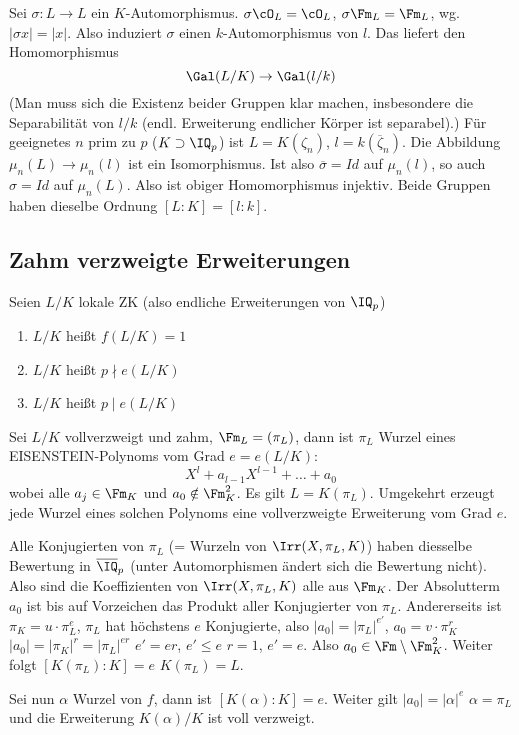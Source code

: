 \begin{Beweis}
 Sei $\sigma:L\rightarrow L$ ein $K$-Automorphismus. $\sigma\cO_L=\cO_L$, $\sigma\Fm_L=\Fm_L$, wg. $|\sigma x|=|x|$. Also induziert $\sigma$ einen $k$-Automorphismus von $l$. Das liefert den Homomorphismus
 \[ \Gal(L/K) \rightarrow \Gal(l/k)\]
 (Man muss sich die Existenz beider Gruppen klar machen, insbesondere die Separabilität von $l/k$ (endl. Erweiterung endlicher Körper ist separabel).)
 Für geeignetes $n$ prim zu $p$ ($K\supset \IQ_p$) ist $L=K(\zeta_n)$, $l=k(\overline\zeta_n)$. Die Abbildung $\mu_n(L)\rightarrow\mu_n(l)$ ist ein Isomorphismus. Ist also $\overline \sigma=Id$ auf $\mu_n(l)$, so auch $\sigma=Id$ auf $\mu_n(L)$. Also ist obiger Homomorphismus injektiv. Beide Gruppen haben dieselbe Ordnung $[L:K]=[l:k]$.
\end{Beweis}

\subsection{Zahm verzweigte Erweiterungen} %
\begin{Definition}
 Seien $L/K$ lokale ZK (also endliche Erweiterungen von $\IQ_p$)
 \begin{enumerate}
  \item $L/K$ heißt  \gdw $f(L/K)=1$
  \item $L/K$ heißt  \gdw $p\nmid e(L/K)$
  \item $L/K$ heißt  \gdw $p\mid e(L/K)$
 \end{enumerate}
\end{Definition}

\begin{Fakt}
 Sei $L/K$ vollverzweigt und zahm, $\Fm_L=(\pi_L)$, dann ist $\pi_L$ Wurzel eines EISENSTEIN-Polynoms vom Grad $e=e(L/K)$: \[ X^l+a_{l-1}X^{l-1}+\ldots+a_0\]
 wobei alle $a_j\in\Fm_K$ und $a_0\notin \Fm_K^2$. Es gilt $L=K(\pi_L)$. Umgekehrt erzeugt jede Wurzel eines solchen Polynoms eine vollverzweigte Erweiterung vom Grad $e$.
\end{Fakt}

\begin{Beweis}
 Alle Konjugierten von $\pi_L$ (= Wurzeln von $\Irr(X,\pi_L,K)$) haben diesselbe Bewertung in $\overline \IQ_p$ (unter Automorphismen ändert sich die Bewertung nicht).
 Also sind die Koeffizienten von $\Irr(X,\pi_L,K)$ alle aus $\Fm_K$. Der Absolutterm $a_0$ ist bis auf Vorzeichen das Produkt aller Konjugierter von $\pi_L$. Andererseits ist $\pi_K=u\cdot \pi_L^e$, $\pi_L$ hat höchstens $e$ Konjugierte, also 
 $|a_0|=|\pi_L|^{e'}$, $a_0=v\cdot \pi_K^r$ \folge $|a_0|=|\pi_K|^r=|\pi_L|^{er}$ \folge $e'=er$, $e'\leq e$ \folge $r=1$, $e'=e$.
 Also $a_0\in\Fm\setminus \Fm_K^2$. Weiter folgt $[K(\pi_L):K]=e$ \folge $K(\pi_L)=L$.
 
 Sei nun $\alpha$ Wurzel von $f$, dann ist $[K(\alpha):K]=e$. Weiter gilt $|a_0|=|\alpha|^e$ \folge $\alpha=\pi_L$ und die Erweiterung $K(\alpha)/K$ ist voll verzweigt.
\end{Beweis}
